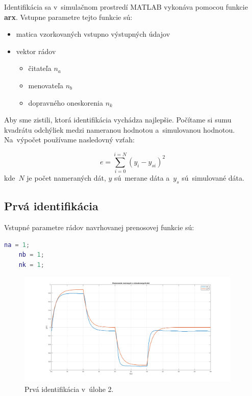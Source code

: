 \documentclass{article}
\begin{document}
Identifikácia sa v~simulačnom prostredí MATLAB vykonáva pomocou funkcie \textbf{arx}.
Vstupne parametre tejto funkcie sú: 
\begin{itemize}
	\item matica vzorkovaných vstupno výstupných údajov
	\item vektor rádov
	\begin{itemize}
		\item čitateľa $n_a$
		\item menovateľa $n_b$
		\item dopravného oneskorenia $n_k$
	\end{itemize}
\end{itemize}

Aby sme zistili, ktorá identifikácia vychádza najlepšie. Počítame si sumu kvadrátu odchýliek medzi nameranou hodnotou
a~simulovanou hodnotou. Na~výpočet používame nasledovný vzťah:

\begin{equation}
	e = \sum_{i=0}^{i=N} (y_i - y_{si})^2
	\label{eq:odchylka}
\end{equation}
kde~$N$ je počet nameraných dát, $y$ sú~merane dáta a~$y_s$ sú~simulované dáta.

\clearpage

\subsection{Prvá identifikácia}
\label{subsec:I1}

Vstupné parametre rádov navrhovanej prenosovej funkcie sú:

\begin{lstlisting}[language=Matlab]
	na = 1;
	nb = 1;
	nk = 1;
\end{lstlisting}

\begin{figure}[!htbp]
	\begin{center}
		\includegraphics[width=0.95\textwidth]{include/I1.png}
	\end{center}
	\caption{Prvá identifikácia v~úlohe 2.}
	\label{fig:I1}
\end{figure}
\end{document}
